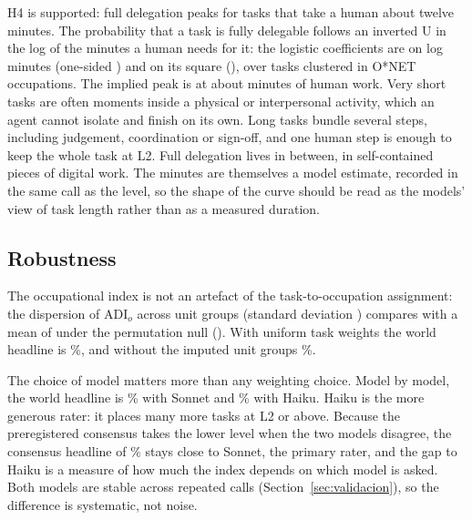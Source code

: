 H4 is supported: full delegation peaks for tasks that take a human about twelve minutes.
The probability that a task is fully delegable follows an inverted U in the log of the minutes a human needs for it: the logistic coefficients are  on log minutes (one-sided ) and  on its square (), over  tasks clustered in  O*NET occupations.
The implied peak is at about  minutes of human work.
Very short tasks are often moments inside a physical or interpersonal activity, which an agent cannot isolate and finish on its own.
Long tasks bundle several steps, including judgement, coordination or sign-off, and one human step is enough to keep the whole task at L2.
Full delegation lives in between, in self-contained pieces of digital work.
The minutes are themselves a model estimate, recorded in the same call as the level, so the shape of the curve should be read as the models' view of task length rather than as a measured duration.

\subsection{Robustness}

The occupational index is not an artefact of the task-to-occupation assignment: the dispersion of $\mathrm{ADI}_o$ across unit groups (standard deviation ) compares with a mean of  under the permutation null ().
With uniform task weights the world headline is \%, and without the imputed unit groups \%.

The choice of model matters more than any weighting choice.
Model by model, the world headline is \% with Sonnet and \% with Haiku.
Haiku is the more generous rater: it places many more tasks at L2 or above.
Because the preregistered consensus takes the lower level when the two models disagree, the consensus headline of \% stays close to Sonnet, the primary rater, and the gap to Haiku is a measure of how much the index depends on which model is asked.
Both models are stable across repeated calls (Section~\ref{sec:validacion}), so the difference is systematic, not noise.
